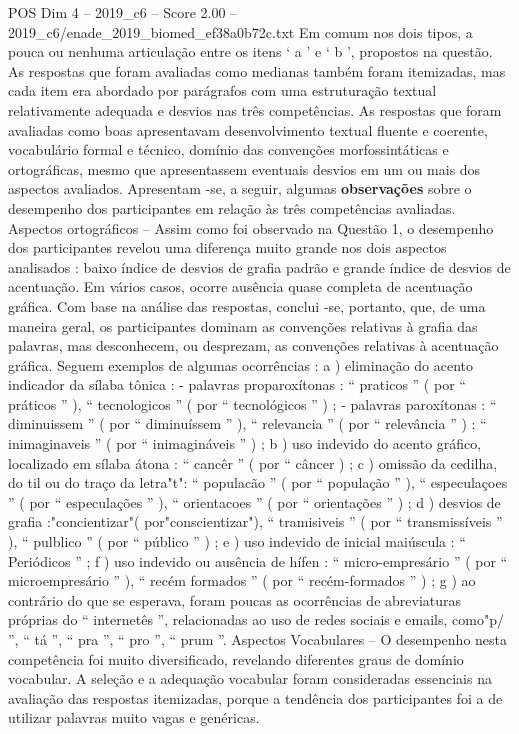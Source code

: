 \begin{textsample}{POS Dim 4 – 2019\_c6 – Score 2.00 – 2019\_c6/enade\_2019\_biomed\_ef38a0b72c.txt}
Em comum nos dois tipos, a pouca ou nenhuma articulação entre os itens ‘ a ’ e ‘ b ’, propostos na questão.
As respostas que foram avaliadas como medianas também foram itemizadas, mas cada item era abordado por parágrafos com uma estruturação textual relativamente adequada e desvios nas três competências.
As respostas que foram avaliadas como boas apresentavam desenvolvimento textual fluente e coerente, vocabulário formal e técnico, domínio das convenções morfossintáticas e ortográficas, mesmo que apresentassem eventuais desvios em um ou mais dos aspectos avaliados.
Apresentam -se, a seguir, algumas \textbf{observações} sobre o desempenho dos participantes em relação às três competências avaliadas.
Aspectos ortográficos – Assim como foi observado na Questão 1, o desempenho dos participantes revelou uma diferença muito grande nos dois aspectos analisados : baixo índice de desvios de grafia padrão e grande índice de desvios de acentuação.
Em vários casos, ocorre ausência quase completa de acentuação gráfica.
Com base na análise das respostas, conclui -se, portanto, que, de uma maneira geral, os participantes dominam as convenções relativas à grafia das palavras, mas desconhecem, ou desprezam, as convenções relativas à acentuação gráfica.
Seguem exemplos de algumas ocorrências : a ) eliminação do acento indicador da sílaba tônica : - palavras proparoxítonas : “ praticos ” ( por “ práticos ” ), “ tecnologicos ” ( por “ tecnológicos ” ) ; - palavras paroxítonas : “ diminuissem ” ( por “ diminuíssem ” ), “ relevancia ” ( por “ relevância ” ) ; “ inimaginaveis ” ( por “ inimagináveis ” ) ; b ) uso indevido do acento gráfico, localizado em sílaba átona : “ cancêr ” ( por “ câncer ) ; c ) omissão da cedilha, do til ou do traço da letra"t": “ populacão ” ( por “ população ” ), “ especulaçoes ” ( por “ especulações ” ), “ orientacoes ” ( por “ orientações ” ) ; d ) desvios de grafia :"concientizar"( por"conscientizar"), “ tramisiveis ” ( por “ transmissíveis ” ), “ pulblico ” ( por “ público ” ) ; e ) uso indevido de inicial maiúscula : “ Periódicos ” ; f ) uso indevido ou ausência de hífen : “ micro-empresário ” ( por “ microempresário ” ), “ recém formados ” ( por “ recém-formados ” ) ; g ) ao contrário do que se esperava, foram poucas as ocorrências de abreviaturas próprias do “ internetês ”, relacionadas ao uso de redes sociais e emails, como"p/ ”, “ tá ”, “ pra ”, “ pro ”, “ prum ”.
Aspectos Vocabulares – O desempenho nesta competência foi muito diversificado, revelando diferentes graus de domínio vocabular.
A seleção e a adequação vocabular foram consideradas essenciais na avaliação das respostas itemizadas, porque a tendência dos participantes foi a de utilizar palavras muito vagas e genéricas.

\end{textsample}
